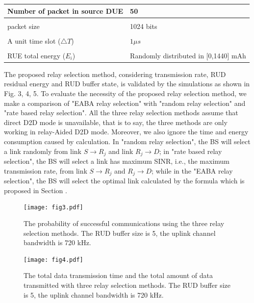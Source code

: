 \documentclass[conference]{IEEEtran}
\begin{document}
\begin{table}[!t]
\begin{tabular}{m{3cm}m{3cm}}
    Number of packet in source DUE &  50 \\
    \hline
    \vspace{1mm}\\[-3mm]
    packet size &  1024 bits\\
    \hline
    \vspace{1mm}\\[-3mm]
    A unit time slot ($\triangle T$) &  $1 \mu s$\\
    \hline
    \vspace{1mm}\\[-3mm]
    RUE total energy ($E_i$) &  Randomly distributed in [0,1440] mAh \\
    \hline
  \end{tabular}
\end{table}

The proposed relay selection method, considering transmission rate, RUD residual energy and RUD buffer state, is validated by the simulations as shown in Fig. 3, 4, 5. To evaluate the necessity of the proposed relay selection method, we make a comparison of "EABA relay selection" with "random relay selection" and "rate based relay selection". All the three relay selection methods assume that direct D2D mode is unavailable, that is to say, the three methods are only working in relay-Aided D2D mode. Moreover, we also ignore the time and energy consumption caused by calculation. In "random relay selection", the BS will select a link randomly from link $S\rightarrow R_j$ and link $R_j\rightarrow D$; in "rate based relay selection", the BS will select a link has maximum SINR, i.e., the maximum transmission rate, from link $S\rightarrow R_j$ and $R_j\rightarrow D$; while in the "EABA relay selection", the BS will select the optimal link calculated by the formula which is proposed in Section \uppercase\expandafter{}.

\begin{figure}[!t]
\texttt{[image: fig3.pdf]}
\caption{The probability of successful communications using the three relay selection methods. The RUD buffer size is 5, the uplink channel bandwidth is 720 kHz.}
\label{fig_success}
\end{figure}
\begin{figure}[!t]
\center
\texttt{[image: fig4.pdf]}
\caption{The total data transmission time and the total amount of data transmitted with three relay selection methods. The RUD buffer size is 5, the uplink channel bandwidth is 720 kHz.}
\label{fig_time}
\end{figure}
\end{document}
